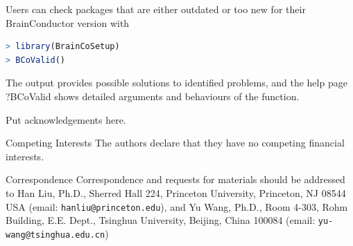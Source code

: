 \documentclass{nature}
\begin{document}
\begin{methods}
Users can check packages that are either outdated or too new for their
BrainConductor version with
\begin{lstlisting}[language = R]
> library(BrainCoSetup)
> BCoValid()
\end{lstlisting}
The output provides possible solutions to identified problems, and the help page
?BCoValid shows detailed arguments and behaviours of the function.
 
 



\end{methods}






\begin{addendum}
 \item Put acknowledgements here.
 \item[Competing Interests] The authors declare that they have no
competing financial interests.
 \item[Correspondence] Correspondence and requests for materials should be
addressed to Han Liu, Ph.D., Sherred Hall 224, Princeton University, Princeton,
NJ 08544 USA (email: \texttt{hanliu@princeton.edu}), and Yu Wang, Ph.D., Room
4-303, Rohm Building, E.E. Dept., Tsinghua University, Beijing, China 100084 
(email: \texttt{yu-wang@tsinghua.edu.cn})
\end{addendum}

	
\end{document}
